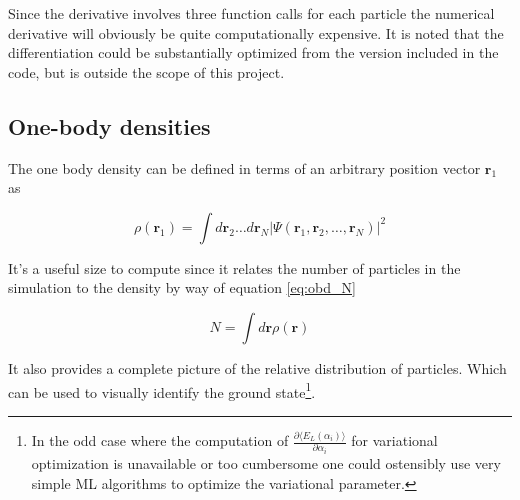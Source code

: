 Since the derivative involves three function calls for each particle the numerical derivative will obviously be quite computationally expensive. It is noted  that the differentiation could be substantially optimized from the version included in the code, but is outside the scope of this project. 


\subsection{One-body densities}
The one body density can be defined in terms of an arbitrary position vector $\mathbf{r}_1$ as 

\begin{equation}\label{eq:obd}
\rho(\mathbf{r}_1) = \int d\mathbf{r}_2 \ldots d\mathbf{r}_N |\Psi(\mathbf{r}_1, \mathbf{r}_2, \ldots, \mathbf{r}_N)|^2
\end{equation}

It's a useful size to compute since it relates the number of particles in the simulation to the density by way of equation \ref{eq:obd_N}

\begin{equation}\label{eq:obd_N}
N = \int d\mathbf{r}\rho(\mathbf{r})
\end{equation}

It also provides a complete picture of the relative distribution of particles. Which can be used to visually identify the ground state\footnote{In the odd case where the computation of $\frac{\partial \langle E_L (\alpha_i) \rangle}{\partial \alpha_i}$ for variational optimization is unavailable or too cumbersome one could ostensibly use very simple ML algorithms to optimize the variational parameter.}. 
